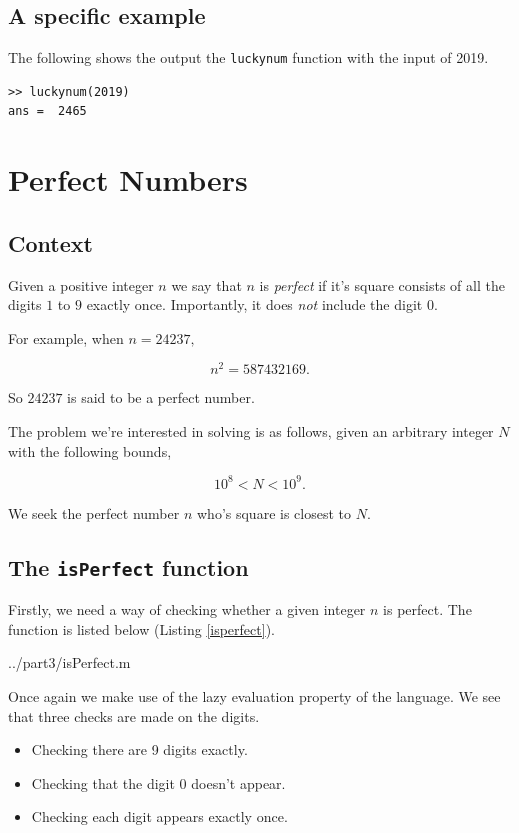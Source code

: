 \documentclass[10pt]{article}
\begin{document}
\subsection{A specific example}

The following shows the output the \texttt{luckynum} function with the input of 2019.

\begin{verbatim}
>> luckynum(2019)
ans =  2465
\end{verbatim}

\section{Perfect Numbers}

\subsection{Context}
Given a positive integer $n$ we say that $n$ is \emph{perfect} if it's square consists of all the digits $1$ to $9$ exactly once. Importantly, it does \emph{not} include the digit $0$.

For example, when $ n = 24237, $

$$ n^2 = 587432169 .$$

So $24237$ is said to be a perfect number.

The problem we're interested in solving is as follows, given an arbitrary integer $N$ with the following bounds,

\begin{equation} \label{rangeN}
10^8 < N < 10^{9}.
\end{equation}


We seek the perfect number $n$ who's square is closest to $N$.

\subsection{The \texttt{isPerfect} function}

Firstly, we need a way of checking whether a given integer $n$ is perfect. The function is listed below (Listing \ref{isperfect}).

  {../part3/isPerfect.m}
 
Once again we make use of the lazy evaluation property of the language. We see that three checks are made on the digits.
 
 \begin{itemize}
 \item Checking there are 9 digits exactly.
 \item Checking that the digit $0$ doesn't appear.
 \item Checking each digit appears exactly once.
 \end{itemize}
 
\end{document}

